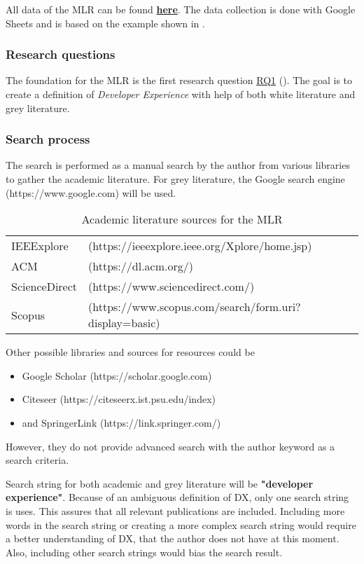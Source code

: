 \documentclass[english, 12pt, a4paper, sci, utf8, a-1b, online]{aaltothesis}
\begin{document}
All data of the MLR can be found \href{\mlrdxlink}{\textbf{here}}. The data collection is done with Google Sheets and is based on the example shown in \cite{guidelines-for-MLR}.

\subsubsection{Research questions}

The foundation for the MLR is the first research question \hyperref[RQ1]{RQ1} (\rqone). The goal is to create a definition of \textit{Developer Experience} with help of both white literature and grey literature.

\subsubsection{Search process}

The search is performed as a manual search by the author from various libraries to gather the academic literature. For grey literature, the Google search engine (https://www.google.com) will be used.

\begin{table}[H]
  \begin{tabular}{ l l }
    IEEExplore     & (https://ieeexplore.ieee.org/Xplore/home.jsp)          \\
    ACM            & (https://dl.acm.org/)                                  \\
    ScienceDirect  & (https://www.sciencedirect.com/)                       \\
    Scopus         & (https://www.scopus.com/search/form.uri?display=basic)
  \end{tabular}
  \caption{Academic literature sources for the MLR}
\end{table}

Other possible libraries and sources for resources could be 
\begin{itemize}
  \item Google Scholar (https://scholar.google.com)
  \item Citeseer (https://citeseerx.ist.psu.edu/index)
  \item and SpringerLink (https://link.springer.com/)
\end{itemize}

However, they do not provide advanced search with the author keyword as a search criteria.   

Search string for both academic and grey literature will be \textbf{"developer experience"}. Because of an ambiguous definition of DX, only one search string is uses. This assures that all relevant publications are included. Including more words in the search string or creating a more complex search string would require a better understanding of DX, that the author does not have at this moment. Also, including other search strings would bias the search result.
\end{document}
